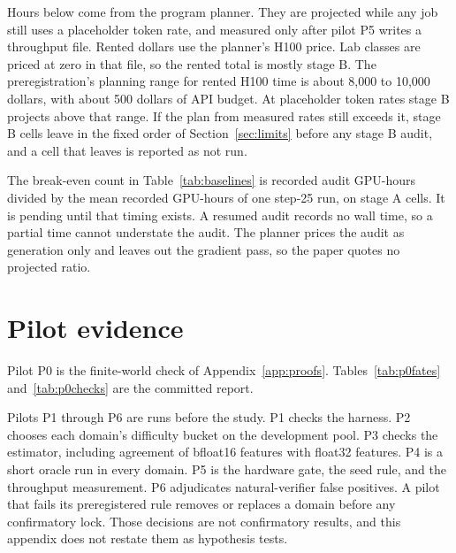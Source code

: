 Hours below come from the program planner.
They are projected while any job still uses a placeholder token rate, and measured only after pilot P5 writes a throughput file.
Rented dollars use the planner's H100 price.
Lab classes are priced at zero in that file, so the rented total is mostly stage B.
The preregistration's planning range for rented H100 time is about 8,000 to 10,000 dollars, with about 500 dollars of API budget.
At placeholder token rates stage B projects above that range.
If the plan from measured rates still exceeds it, stage B cells leave in the fixed order of Section~\ref{sec:limits} before any stage B audit, and a cell that leaves is reported as not run.

\begin{table}[t]
\caption{Projected compute by stage and hardware class.}
\label{tab:compute}
\centering
\small

\end{table}

The break-even count in Table~\ref{tab:baselines} is recorded audit GPU-hours divided by the mean recorded GPU-hours of one step-25 run, on stage A cells.
It is pending until that timing exists.
A resumed audit records no wall time, so a partial time cannot understate the audit.
The planner prices the audit as generation only and leaves out the gradient pass, so the paper quotes no projected ratio.

\section{Pilot evidence}
\label{app:pilots}

Pilot P0 is the finite-world check of Appendix~\ref{app:proofs}.
Tables~\ref{tab:p0fates} and~\ref{tab:p0checks} are the committed report.

\begin{table}[t]
\caption{Pilot P0 trained held-out accuracy at a matched $J$.}
\label{tab:p0fates}
\centering
\small

\end{table}

\begin{table}[t]
\caption{Pilot P0 checks. Each value is the committed report's number for that check.}
\label{tab:p0checks}
\centering
\small
\setlength{\tabcolsep}{3pt}

\end{table}

Pilots P1 through P6 are runs before the study.
P1 checks the harness.
P2 chooses each domain's difficulty bucket on the development pool.
P3 checks the estimator, including agreement of bfloat16 features with float32 features.
P4 is a short oracle run in every domain.
P5 is the hardware gate, the seed rule, and the throughput measurement.
P6 adjudicates natural-verifier false positives.
A pilot that fails its preregistered rule removes or replaces a domain before any confirmatory lock.
Those decisions are not confirmatory results, and this appendix does not restate them as hypothesis tests.

